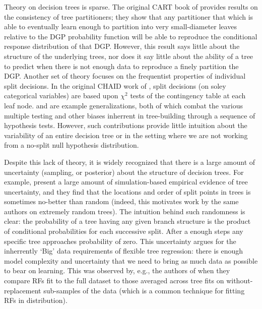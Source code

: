 \documentclass[12pt]{article}
\begin{document}
Theory on decision trees is sparse. The original CART book of
\cite{breiman_classification_1984} provides results on the consistency
of tree partitioners; they show that any partitioner that which is able
to eventually learn enough to partition into very small-diameter leaves
relative to the DGP probability function will be able to reproduce the
conditional response distribution of that DGP. However, this result says
little about the structure of the underlying trees, nor does it say
little about the ability of a tree to predict when there is not enough
data to reproduce a finely partition the DGP. Another set of theory
focuses on the frequentist properties of individual split decisions. In
the original CHAID work of \cite{kass_exploratory_1980}, split decisions
(on soley categorical variables) are based upon $\chi^2$ tests of the
contingency table at each leaf node. \cite{loh_regression_2002} and
\cite{hothorn_unbiased_2006} are example generalizations, both of which
combat the various multiple testing and other biases inherrent in
tree-building through a sequence of hypothesis tests. However, such
contributions provide little intuition about the variability of an
entire decision tree or in the setting where we are not working from a
no-split null hypothesis distribution.

Despite this lack of theory, it is widely recognized that there is a
large amount of uncertainty (sampling, or posterior) about the structure
of decision trees. For example, \cite{geurts_investigation_2000} present
a large amount of simulation-based empirical evidence of tree
uncertainty, and they find that the locations and order of split points
in trees is sometimes no-better than random (indeed, this motivates work
by the same authors on extremely random trees). The intuition behind
such randomness is clear: the probability of a tree having any given
branch structure is the product of conditional probabilities for each
successive split. After a enough steps any specific tree approaches
probability of zero. This uncertainty argues for the inherrently `Big'
data requirements of flexible tree regression: there is enough model
complexity and uncertainty that we need to bring as much data as
possible to bear on learning. This was observed by, e.g., the authors of
\cite{panda_planet:_2009} when they compare RFs fit to the full dataset
to those averaged across tree fits on without-replacement sub-samples of
the data (which is a common technique for fitting RFs in distribution).
\end{document}
